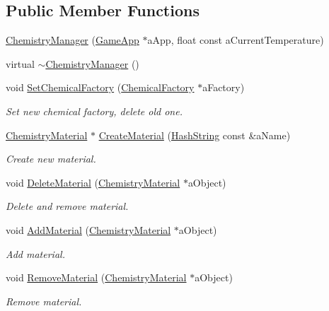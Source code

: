 \subsection*{Public Member Functions}
\begin{DoxyCompactItemize}
\item 
\hyperlink{classChemistryManager_a163b71992600516641201da0c25ae746}{Chemistry\+Manager} (\hyperlink{classGameApp}{Game\+App} $\ast$a\+App, float const a\+Current\+Temperature)
\item 
virtual \hyperlink{classChemistryManager_ab45c29391f3ab6a9687c4ce118cd092d}{$\sim$\+Chemistry\+Manager} ()
\item 
void \hyperlink{classChemistryManager_a35d222f3cb748f47a955a969818e1639}{Set\+Chemical\+Factory} (\hyperlink{classChemicalFactory}{Chemical\+Factory} $\ast$a\+Factory)
\begin{DoxyCompactList}\small\item\em Set new chemical factory, delete old one. \end{DoxyCompactList}\item 
\hyperlink{classChemistryMaterial}{Chemistry\+Material} $\ast$ \hyperlink{classChemistryManager_a23023410969465d5c4ec4e23afbd2177}{Create\+Material} (\hyperlink{classHashString}{Hash\+String} const \&a\+Name)
\begin{DoxyCompactList}\small\item\em Create new material. \end{DoxyCompactList}\item 
void \hyperlink{classChemistryManager_a7902113012ab4861bb271f51053ce533}{Delete\+Material} (\hyperlink{classChemistryMaterial}{Chemistry\+Material} $\ast$a\+Object)
\begin{DoxyCompactList}\small\item\em Delete and remove material. \end{DoxyCompactList}\item 
void \hyperlink{classChemistryManager_a8b11a9f62edd83a7c16e9182a2d984bb}{Add\+Material} (\hyperlink{classChemistryMaterial}{Chemistry\+Material} $\ast$a\+Object)
\begin{DoxyCompactList}\small\item\em Add material. \end{DoxyCompactList}\item 
void \hyperlink{classChemistryManager_a72216de847f242a215393df85c43923d}{Remove\+Material} (\hyperlink{classChemistryMaterial}{Chemistry\+Material} $\ast$a\+Object)
\begin{DoxyCompactList}\small\item\em Remove material. \end{DoxyCompactList}\item 

\end{DoxyCompactItemize}
